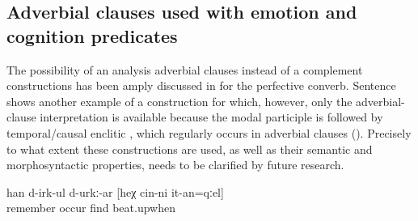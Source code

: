 \subsection{Adverbial clauses used with emotion and cognition predicates}
\label{ssec:Adverbial clauses used with emotion and cognition predicates}
The possibility of an analysis adverbial clauses instead of a complement constructions has been amply discussed in  for the perfective converb. Sentence  shows another example of a construction for which, however, only the adverbial-clause interpretation is available because the modal participle is followed by temporal/causal enclitic  , which regularly occurs in adverbial clauses (). Precisely to what extent these constructions are used, as well as their semantic and morphosyntactic properties, needs to be clarified by future research.


\begin{exe}
	\ex	\label{ex:‎He is probably remembering when he was beaten}
	\gll	han	d-irk-ul	d-urkː-ar	[heχ	cin-ni	it-an=qːel]\\
		remember	occur	find			beat.upwhen\\
	\glt	{}
\end{exe}
